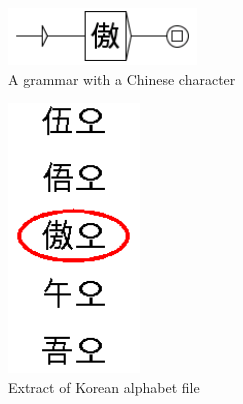 \begin{figure}[!ht]
\begin{center}
\includegraphics[width=5cm]{resources/img/fig7-korean5.png}
\caption{A grammar with a Chinese character\label{fig7-korean5}}
\end{center}
\end{figure}

\begin{figure}[!ht]
\begin{center}
\includegraphics[width=3.5cm]{resources/img/fig7-korean6.png}
\caption{Extract of Korean alphabet file\label{fig7-korean6}}
\end{center}
\end{figure}
